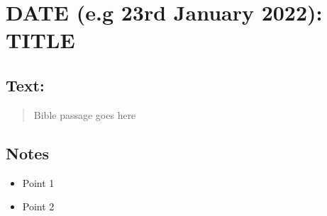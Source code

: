 \setcounter{figure}{0}

\section{DATE (e.g 23rd January 2022): TITLE}
\subsection*{Text: }
  \begin{quote}
    Bible passage goes here
  \end{quote}
\subsection*{Notes}
\begin{itemize}
  \item Point 1
  \item Point 2
\end{itemize}